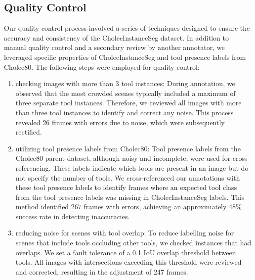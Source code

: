 \subsection*{Quality Control}\hypertarget{sec:quality_control}{}
Our quality control process involved a series of techniques designed to ensure the accuracy and consistency of the CholecInstanceSeg dataset. In addition to manual quality control and a secondary review by another annotator, we leveraged specific properties of CholecInstanceSeg and tool presence labels from Cholec80. The following steps were employed for quality control:
\begin{enumerate}
    \item checking images with more than 3 tool instances: During annotation, we observed that the most crowded scenes typically included a maximum of three separate tool instances. Therefore, we reviewed all images with more than three tool instances to identify and correct any noise. This process revealed 26 frames with errors due to noise, which were subsequently rectified.
    \item utilizing tool presence labels from Cholec80: Tool presence labels from the Cholec80 parent dataset, although noisy and incomplete, were used for cross-referencing. These labels indicate which tools are present in an image but do not specify the number of tools.
    We cross-referenced our annotations with these tool presence labels to identify frames where an expected tool class from the tool presence labels was missing in CholecInstanceSeg labels. 
    This method identified 267 frames with errors, achieving an approximately 48\% success rate in detecting inaccuracies.   
    \item reducing noise for scenes with tool overlap:  To reduce labelling noise for scenes that include tools occluding other tools, we checked instances that had overlaps. We set a fault tolerance of a 0.1 IoU overlap threshold between tools. All images with intersections exceeding this threshold were reviewed and corrected, resulting in the adjustment of 247 frames. 
\end{enumerate}    
